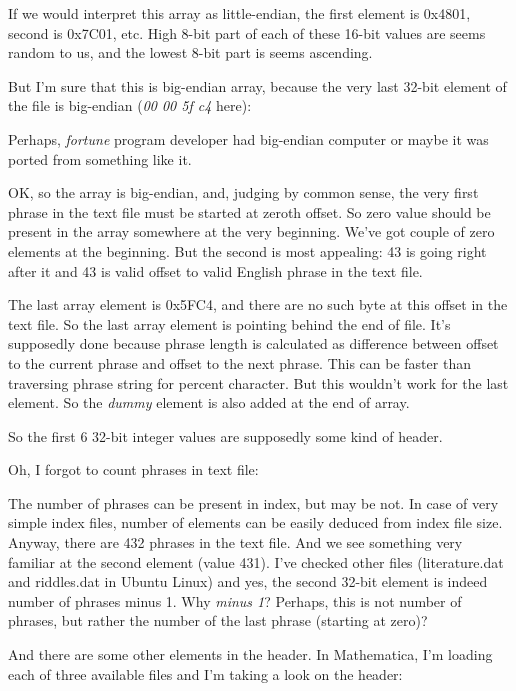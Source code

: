 

If we would interpret this array as little-endian, the first element is 0x4801, second is 0x7C01, etc.
High 8-bit part of each of these 16-bit values are seems random to us, and the lowest 8-bit part is seems ascending.

But I'm sure that this is big-endian array, because the very last 32-bit element of the file is big-endian 
(\emph{00 00 5f c4} here):



Perhaps, \emph{fortune} program developer had big-endian computer or maybe it was ported from something like it.

OK, so the array is big-endian, and, judging by common sense, the very first phrase in the text file must be started at zeroth offset. So zero value should be present in the array somewhere at the very beginning.
We've got couple of zero elements at the beginning. But the second is most appealing: 43 is going right after it and 43 is valid offset to valid English phrase in the text file.

The last array element is 0x5FC4, and there are no such byte at this offset in the text file.
So the last array element is pointing behind the end of file.
It's supposedly done because phrase length is calculated as difference between offset to the current phrase
and offset to the next phrase. 
This can be faster than traversing phrase string for percent character.
But this wouldn't work for the last element.
So the \emph{dummy} element is also added at the end of array.

So the first 6 32-bit integer values are supposedly some kind of header.

Oh, I forgot to count phrases in text file:



The number of phrases can be present in index, but may be not.
In case of very simple index files, number of elements can be easily deduced from index file size.
Anyway, there are 432 phrases in the text file.
And we see something very familiar at the second element (value 431).
I've checked other files (literature.dat and riddles.dat in Ubuntu Linux) and yes, the second 32-bit element is indeed number of phrases minus 1.
Why \emph{minus 1}? Perhaps, this is not number of phrases, but rather the number of the last phrase (starting at zero)?

And there are some other elements in the header.
In Mathematica, I'm loading each of three available files and I'm taking a look on the header:

